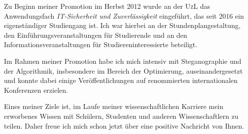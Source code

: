 \documentclass[11pt,a4paper,sans]{moderncv}        %
\begin{document}
Zu Beginn meiner Promotion im Herbst 2012 wurde an der \textsc{UzL} 
 das Anwendungsfach \emph{IT-Sicherheit und Zuverlässigkeit}
eingeführt, das seit 2016 ein eigenständiger Studiengang ist.
Ich war hierbei an der Stundenplangestaltung, 
den Einführungsveranstaltungen für Studierende und an den 
Informations\-veranstaltungen für Studiereninteressierte beteiligt.

Im Rahmen meiner Promotion habe ich mich intensiv mit Steganographie und
der Algorithmik, insbesondere im Bereich der Optimierung,
auseinandergesetzt und konnte dabei einige Veröffentlichungen auf
renommierten internationalen Konferenzen erzielen.

Eines meiner Ziele ist, im Laufe meiner wissenschaftlichen Karriere mein
erworbenes Wissen mit Schülern, Studenten und anderen Wissenschaftlern zu teilen. Daher
freue ich mich schon jetzt über
eine positive Nachricht von Ihnen. 



\makeletterclosing
\clearpage

\makecvtitle
\end{document}
